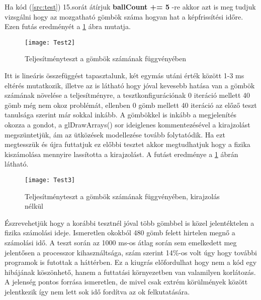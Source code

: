 Ha kód (\ref{src:test}) 15.sorát átírjuk \textbf{ballCount += 5} -re akkor azt is meg tudjuk vizsgálni hogy az mozgatható gömbök száma hogyan hat a képfrissítési időre. Ezen futás eredményét a \ref{fig:Test2} ábra mutatja.

\begin{figure}[H]
	\centering
	\texttt{[image: Test2]}
	\caption{Teljesítményteszt a gömbök számának függvényében}
	\label{fig:Test2}
\end{figure}

Itt is lineáris összefüggést tapasztalunk, két egymás utáni érték között 1-3 ms eltérés mutatkozik, illetve az is látható hogy jóval kevesebb hatása van a gömbök számának növelése a teljesítményre, a tesztkonfigurációnak 0 iteráció mellett 40 gömb még nem okoz problémát, ellenben 0 gömb mellett 40 iteráció az előző teszt tanulsága szerint már sokkal inkább.
A gömbökkel is inkább a megjelenítés okozza a gondot, a glDrawArrays() sor ideiglenes kommentezésével a kirajzolást megszüntetjük, ám az ütközések modellezése tovább folytatódik. Ha ezt megtesszük és újra futtatjuk ez előbbi tesztet akkor megtudhatjuk hogy a fizika kiszámolása mennyire lassította a kirajzolást. A futást eredménye a \ref{fig:Test2} ábrán látható.

\begin{figure}[H]
	\centering
	\texttt{[image: Test3]}
	\caption{Teljesítményteszt a gömbök számának függvényében, kirajzolás nélkül}
	\label{fig:Test3}
\end{figure}

Észrevehetjük hogy a korábbi tesztnél jóval több gömbbel is közel jelentéktelen a fizika számolási ideje. Ismeretlen okokból 480 gömb felett hirtelen megnő a számolási idő. A teszt során az 1000 ms-os átlag során sem emelkedett meg jelentősen a processzor kihasználtsága, szám szerint 14\%-os volt úgy hogy további programok is futottak a háttérben. Ez a kiugrás előfordulhat hogy nem a kód egy hibájának köszönhető, hanem a futtatási környezetben van valamilyen korlátozás. A jelenség pontos forrása ismeretlen, de mivel csak extrém körülmények között jelentkezik így nem lett sok idő fordítva az ok felkutatására.